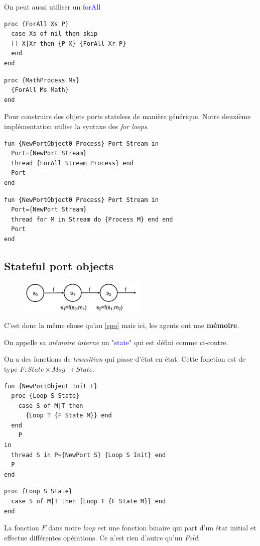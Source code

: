 \documentclass{report}
\begin{document}
On peut aussi utiliser un \textcolor{blue}{forAll}

\begin{lstlisting}[escapechar=\%]
proc {ForAll Xs P} 
  case Xs of nil then skip 
  [] X|Xr then {P X} {ForAll Xr P} 
  end
end
\end{lstlisting}
\begin{lstlisting}[escapechar=\%]
proc {MathProcess Ms} 
  {ForAll Ms Math} 
end
\end{lstlisting}


Pour construire des objets ports stateless de manière générique. Notre deuxième implémentation utilise la syntaxe des \textit{for loops}. 
\begin{lstlisting}[escapechar=\%]
fun {NewPortObject0 Process} Port Stream in
  Port={NewPort Stream} 
  thread {ForAll Stream Process} end 
  Port
end
\end{lstlisting}
\begin{lstlisting}[escapechar=\%]
fun {NewPortObject0 Process} Port Stream in
  Port={NewPort Stream} 
  thread for M in Stream do {Process M} end end 
  Port
end
\end{lstlisting}

\subsection{Stateful port objects}
\begin{figure}
\centering
\includegraphics[width=6cm]{img/statefulPortObject.png}
\end{figure}
C'est donc la même chose qu'au \ref{spo} mais ici, les agents ont une \textbf{mémoire}.\par 
On appelle sa \textit{mémoire interne} un "\textcolor{blue}{state}" qui est défini comme ci-contre.\par 
On a des fonctions de \textit{transition} qui passe d'état en état. Cette fonction est de type $F	: State \times Msg \longrightarrow State$.
\begin{lstlisting}[escapechar=\%]
fun {NewPortObject Init F} 
  proc {Loop S State} 
    case S of M|T then 
      {Loop T {F State M}} end
  end 
    P
in
  thread S in P={NewPort S} {Loop S Init} end 
  P
end
\end{lstlisting}
\begin{lstlisting}[escapechar=\%]
proc {Loop S State} 
  case S of M|T then {Loop T {F State M}} end
end
\end{lstlisting}
La fonction $F$ dans notre \textit{loop} est une fonction binaire qui part d'un état initial et effectue différentes opérations. Ce n'est rien d'autre qu'un \textit{Fold}.
\end{document}
